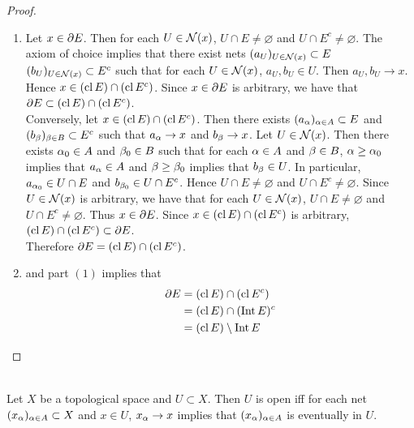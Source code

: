 \documentclass{book}
\begin{document}
	\begin{proof}\
		\begin{enumerate}
			\item Let $x \in \partial E$. Then for each $U \in \mathcal{N}(x)$, $U \cap E \neq \varnothing$ and $U \cap E^c \neq \varnothing$. The axiom of choice implies that there exist nets $(a_U)_{U \in \mathcal{N}(x)} \subset E$ $(b_U)_{U \in \mathcal{N}(x)} \subset E^c$ such that for each $U \in \mathcal{N}(x)$, $a_U, b_U \in U$. Then $a_U, b_U \rightarrow x$. Hence $x \in (\operatorname{cl} E) \cap (\operatorname{cl} E^c)$. Since $x \in \partial E$ is arbitrary, we have that $\partial E \subset (\operatorname{cl} E) \cap (\operatorname{cl} E^c)$. \\
			Conversely, let $x \in (\operatorname{cl} E) \cap (\operatorname{cl} E^c)$. Then there exists $(a_{\alpha})_{\alpha \in A} \subset E$ and $(b_{\beta})_{\beta \in B} \subset E^c$ such that $a_{\alpha} \rightarrow x$ and $b_{\beta} \rightarrow x$. Let $U \in \mathcal{N}(x)$. Then there exists $\alpha_0 \in A$ and $\beta_0 \in B$ such that for each $\alpha \in A$ and $\beta \in B$, $\alpha \geq \alpha_0$ implies that $a_{\alpha} \in A$ and $\beta \geq \beta_0$ implies that $b_{\beta} \in U$. In particular, $a_{\alpha_0} \in U \cap E$ and $b_{\beta_0} \in U \cap E^c$. Hence $U \cap E \neq \varnothing$ and $U \cap E^c \neq \varnothing$. Since $U \in \mathcal{N}(x)$ is arbitrary, we have that for each $U \in \mathcal{N}(x)$, $U \cap E \neq \varnothing$ and $U \cap E^c \neq \varnothing$. Thus $x \in \partial E$. Since $x \in (\operatorname{cl} E) \cap (\operatorname{cl} E^c)$ is arbitrary, $(\operatorname{cl} E) \cap (\operatorname{cl} E^c) \subset \partial E$. \\
			Therefore $\partial E = (\operatorname{cl} E) \cap (\operatorname{cl} E^c)$.
			\item {} and part $(1)$ implies that 
			\begin{align*}
				\partial E
				& = (\operatorname{cl} E) \cap (\operatorname{cl} E^c) \\
				& = (\operatorname{cl} E) \cap (\operatorname{Int} E)^c \\
				& = (\operatorname{cl} E) \setminus \operatorname{Int} E
			\end{align*}
		\end{enumerate}
	\end{proof}
	

	\begin{ex}   \\
		Let $X$ be a topological space and $U \subset X$. Then $U$ is open iff for each net $(x_{\alpha})_{\alpha \in A} \subset X$ and $x \in U$, $x_{\alpha} \rightarrow x$ implies that $(x_{\alpha})_{\alpha \in A} $ is eventually in $U$.
	\end{ex}
\end{document}
